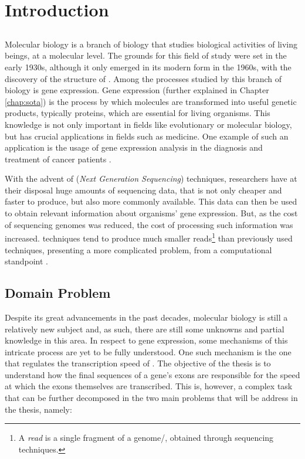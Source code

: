 \chapter{Introduction} \label{chap:intro}

\section*{}

Molecular biology is a branch of biology that studies biological activities of
living beings, at a molecular level. The grounds for this field of study were
set in the early 1930s, although it only emerged in its modern form in the
1960s, with the discovery of the structure of \dna. Among the processes studied
by this branch of biology is gene expression. Gene expression (further explained
in Chapter \ref{chap:sota}) is the process by which \dna{} molecules are
transformed into useful genetic products, typically proteins, which are
essential for living organisms. This knowledge is not only important in fields
like evolutionary or molecular biology, but has crucial applications in fields
such as medicine. One example of such an application is the usage of gene
expression analysis in the diagnosis and treatment of cancer patients
\cite{Pusztai01062003}.

With the advent of \ngs{} (\textit{Next Generation Sequencing}) techniques, researchers
have at their disposal huge amounts of sequencing data, that is not only cheaper
and faster to produce, but also more commonly available. This data can then be
used to obtain relevant information about organisms' gene expression. But, as
the cost of sequencing genomes was reduced, the cost of processing such
information was increased. \ngs{} techniques tend to produce much smaller
reads\footnote{A \textit{read} is a single fragment of a genome/\trans, obtained
through sequencing techniques.} than previously used techniques, presenting a
more complicated problem, from a computational standpoint \cite{Wolf2013}.

\section{Domain Problem} \label{sec:problem}

Despite its great advancements in the past decades, molecular biology is still a
relatively new subject and, as such, there are still some unknowns and partial
knowledge in this area. In respect to gene expression, some mechanisms of this
intricate process are yet to be fully understood. One such mechanism is the one
that regulates the transcription speed of \rna. The objective of the thesis is
to understand how the final sequences of a gene's exons are responsible for the
speed at which the exons themselves are transcribed. This is, however, a complex
task that can be further decomposed in the two main problems that will be
address in the thesis, namely:

